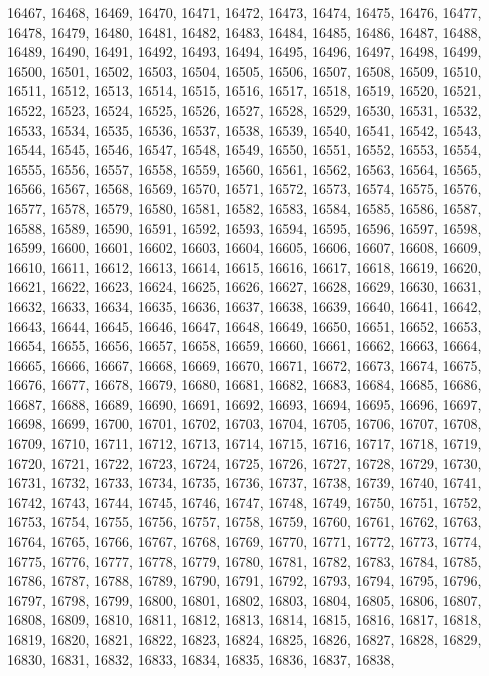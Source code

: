 16467,
16468,
16469,
16470,
16471,
16472,
16473,
16474,
16475,
16476,
16477,
16478,
16479,
16480,
16481,
16482,
16483,
16484,
16485,
16486,
16487,
16488,
16489,
16490,
16491,
16492,
16493,
16494,
16495,
16496,
16497,
16498,
16499,
16500,
16501,
16502,
16503,
16504,
16505,
16506,
16507,
16508,
16509,
16510,
16511,
16512,
16513,
16514,
16515,
16516,
16517,
16518,
16519,
16520,
16521,
16522,
16523,
16524,
16525,
16526,
16527,
16528,
16529,
16530,
16531,
16532,
16533,
16534,
16535,
16536,
16537,
16538,
16539,
16540,
16541,
16542,
16543,
16544,
16545,
16546,
16547,
16548,
16549,
16550,
16551,
16552,
16553,
16554,
16555,
16556,
16557,
16558,
16559,
16560,
16561,
16562,
16563,
16564,
16565,
16566,
16567,
16568,
16569,
16570,
16571,
16572,
16573,
16574,
16575,
16576,
16577,
16578,
16579,
16580,
16581,
16582,
16583,
16584,
16585,
16586,
16587,
16588,
16589,
16590,
16591,
16592,
16593,
16594,
16595,
16596,
16597,
16598,
16599,
16600,
16601,
16602,
16603,
16604,
16605,
16606,
16607,
16608,
16609,
16610,
16611,
16612,
16613,
16614,
16615,
16616,
16617,
16618,
16619,
16620,
16621,
16622,
16623,
16624,
16625,
16626,
16627,
16628,
16629,
16630,
16631,
16632,
16633,
16634,
16635,
16636,
16637,
16638,
16639,
16640,
16641,
16642,
16643,
16644,
16645,
16646,
16647,
16648,
16649,
16650,
16651,
16652,
16653,
16654,
16655,
16656,
16657,
16658,
16659,
16660,
16661,
16662,
16663,
16664,
16665,
16666,
16667,
16668,
16669,
16670,
16671,
16672,
16673,
16674,
16675,
16676,
16677,
16678,
16679,
16680,
16681,
16682,
16683,
16684,
16685,
16686,
16687,
16688,
16689,
16690,
16691,
16692,
16693,
16694,
16695,
16696,
16697,
16698,
16699,
16700,
16701,
16702,
16703,
16704,
16705,
16706,
16707,
16708,
16709,
16710,
16711,
16712,
16713,
16714,
16715,
16716,
16717,
16718,
16719,
16720,
16721,
16722,
16723,
16724,
16725,
16726,
16727,
16728,
16729,
16730,
16731,
16732,
16733,
16734,
16735,
16736,
16737,
16738,
16739,
16740,
16741,
16742,
16743,
16744,
16745,
16746,
16747,
16748,
16749,
16750,
16751,
16752,
16753,
16754,
16755,
16756,
16757,
16758,
16759,
16760,
16761,
16762,
16763,
16764,
16765,
16766,
16767,
16768,
16769,
16770,
16771,
16772,
16773,
16774,
16775,
16776,
16777,
16778,
16779,
16780,
16781,
16782,
16783,
16784,
16785,
16786,
16787,
16788,
16789,
16790,
16791,
16792,
16793,
16794,
16795,
16796,
16797,
16798,
16799,
16800,
16801,
16802,
16803,
16804,
16805,
16806,
16807,
16808,
16809,
16810,
16811,
16812,
16813,
16814,
16815,
16816,
16817,
16818,
16819,
16820,
16821,
16822,
16823,
16824,
16825,
16826,
16827,
16828,
16829,
16830,
16831,
16832,
16833,
16834,
16835,
16836,
16837,
16838,

